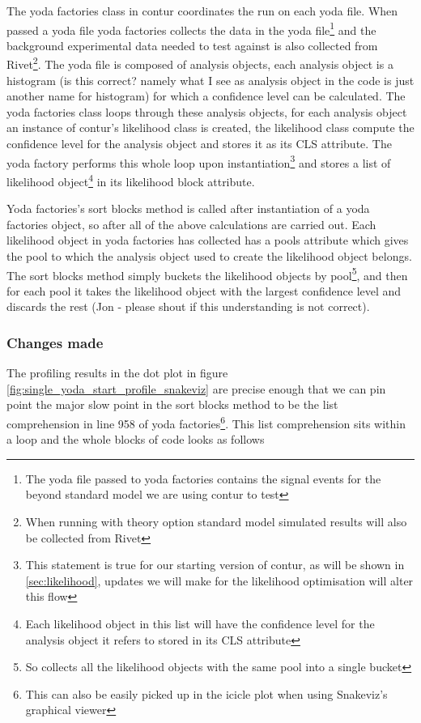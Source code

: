 The yoda factories class in contur coordinates the run on each yoda file. When passed a yoda file yoda factories collects the data in the yoda file\footnote{The yoda file passed to yoda factories contains the signal events for the beyond standard model we are using contur to test} and the background experimental data needed to test against is also collected from Rivet\footnote{When running with theory option standard model simulated results will also be collected from Rivet}. The yoda file is composed of analysis objects, each analysis object is a histogram (is this correct? namely what I see as analysis object in the code is just another name for histogram) for which a confidence level can be calculated. The yoda factories class loops through these analysis objects, for each analysis object an instance of contur's likelihood class is created, the likelihood class compute the confidence level for the analysis object and stores it as its CLS attribute. The yoda factory performs this whole loop upon instantiation\footnote{This statement is true for our starting version of contur, as will be shown in \ref{sec:likelihood}, updates we will make for the likelihood optimisation will alter this flow} and stores a list of likelihood object\footnote{Each likelihood object in this list will have the confidence level for the analysis object it refers to stored in its CLS attribute} in its likelihood block attribute.

Yoda factories's sort blocks method is called after instantiation of a yoda factories object, so after all of the above calculations are carried out. Each likelihood object in yoda factories has collected has a pools attribute which gives the pool to which the analysis object used to create the likelihood object belongs. The sort blocks method simply buckets the likelihood objects by pool\footnote{So collects all the likelihood objects with the same pool into a single bucket}, and then for each pool it takes the likelihood object with the largest confidence level and discards the rest (Jon - please shout if this understanding is not correct).

\subsubsection{Changes made}
The profiling results in the dot plot in figure  \ref{fig:single_yoda_start_profile_snakeviz} are precise enough that we can pin point the major slow point in the sort blocks method to be the list comprehension in line 958 of yoda factories\footnote{This can also be easily picked up in the icicle plot when using Snakeviz's graphical viewer}. This list comprehension sits within a loop and the whole blocks of code looks as follows 


